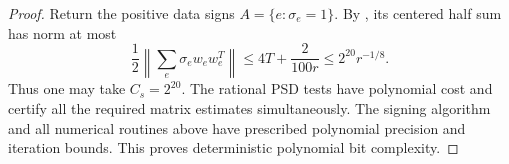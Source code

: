 \begin{proof}
Return the positive data signs $A=\{e:\sigma_e=1\}$.
By , its centered half
sum has norm at most
\[
 \frac12\left\|\sum_e\sigma_e w_ew_e^T\right\|
       \le4T+\frac2{100r}
       \le2^{20}r^{-1/8}.
\]
Thus one may take $C_s=2^{20}$. The rational PSD tests have polynomial
cost and certify all the required matrix estimates simultaneously.
The signing algorithm and all numerical routines above have prescribed
polynomial precision and iteration bounds. This proves deterministic
polynomial bit complexity.
\end{proof}
